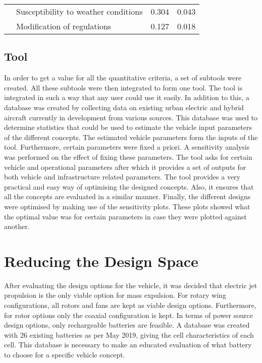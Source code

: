 \begin{table}[h]
{\begin{tabular}{|l|l|c|c|}
                                                                                          & Susceptibility to weather conditions & 0.304                 & 0.043                 \\ \cline{2-4} 
                                                                                          & Modification of regulations          & 0.127                 & 0.018                 \\ \hline
\end{tabular}%
}
\end{table}


\subsection{Tool}
In order to get a value for all the quantitative criteria, a set of subtools were created. All these subtools were then integrated to form one tool. The tool is integrated in such a way that any user could use it easily. In addition to this, a database was created by collecting data on existing urban electric and hybrid aircraft currently in development from various sources. This database was used to determine statistics that could be used to estimate the vehicle input parameters of the different concepts. The estimated vehicle parameters form the inputs of the tool. Furthermore, certain parameters were fixed a priori. A sensitivity analysis was performed on the effect of fixing these parameters. The tool asks for certain vehicle and operational parameters after which it provides a set of outputs for both vehicle and infrastructure related parameters. The tool provides a very practical and easy way of optimising the designed concepts. Also, it ensures that all the concepts are evaluated in a similar manner. Finally, the different designs were optimised by making use of the sensitivity plots. These plots showed what the optimal value was for certain parameters in case they were plotted against another. 

\section{Reducing the Design Space}
After evaluating the design options for the vehicle, it was decided that electric jet propulsion is the only viable option for mass expulsion. For rotary wing configurations, all rotors and fans are kept as viable design options. Furthermore, for rotor options only the coaxial configuration is kept. In terms of power source design options, only rechargeable batteries are feasible. A database was created with 26 existing batteries as per May 2019, giving the cell characteristics of each cell. This database is necessary to make an educated evaluation of what battery to choose for a specific vehicle concept.


